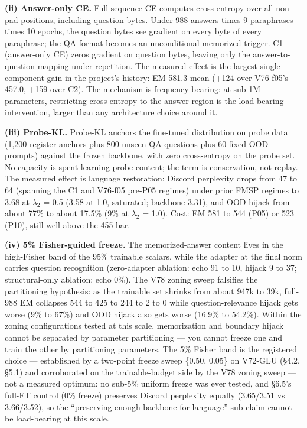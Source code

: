 \documentclass[11pt]{article}
\begin{document}
\textbf{(ii) Answer-only CE.} Full-sequence CE computes cross-entropy over all non-pad positions, including question bytes. Under 988 answers times 9 paraphrases times 10 epochs, the question bytes see gradient on every byte of every paraphrase; the QA format becomes an unconditional memorized trigger. C1 (answer-only CE) zeros gradient on question bytes, leaving only the answer-to-question mapping under repetition. The measured effect is the largest single-component gain in the project's history: EM 581.3 mean (+124 over V76-f05's 457.0, +159 over C2). The mechanism is frequency-bearing: at sub-1M parameters, restricting cross-entropy to the answer region is the load-bearing intervention, larger than any architecture choice around it.

\textbf{(iii) Probe-KL.} Probe-KL anchors the fine-tuned distribution on probe data (1{,}200 register anchors plus 800 unseen QA questions plus 60 fixed OOD prompts) against the frozen backbone, with zero cross-entropy on the probe set. No capacity is spent learning probe content; the term is conservation, not replay. The measured effect is language restoration: Discord perplexity drops from 47 to 64 (spanning the C1 and V76-f05 pre-P05 regimes) under prior FMSP regimes to 3.68 at $\lambda_2$ = 0.5 (3.58 at 1.0, saturated; backbone 3.31), and OOD hijack from about 77\% to about 17.5\% (9\% at $\lambda_2$ = 1.0). Cost: EM 581 to 544 (P05) or 523 (P10), still well above the 455 bar.

\textbf{(iv) 5\% Fisher-guided freeze.} The memorized-answer content lives in the high-Fisher band of the 95\% trainable scalars, while the adapter at the final norm carries question recognition (zero-adapter ablation: echo 91 to 10, hijack 9 to 37; structural-only ablation: echo 0\%). The V78 zoning sweep falsifies the partitioning hypothesis: as the trainable set shrinks from about 947k to 39k, full-988 EM collapses 544 to 425 to 244 to 2 to 0 while question-relevance hijack gets worse (9\% to 67\%) and OOD hijack also gets worse (16.9\% to 54.2\%). Within the zoning configurations tested at this scale, memorization and boundary hijack cannot be separated by parameter partitioning --- you cannot freeze one and train the other by partitioning parameters. The 5\% Fisher band is the registered choice --- established by a two-point freeze sweep \{0.50, 0.05\} on V72-GLU (\S4.2, \S5.1) and corroborated on the trainable-budget side by the V78 zoning sweep --- not a measured optimum: no sub-5\% uniform freeze was ever tested, and \S6.5's full-FT control (0\% freeze) preserves Discord perplexity equally (3.65/3.51 vs 3.66/3.52), so the ``preserving enough backbone for language'' sub-claim cannot be load-bearing at this scale.
\end{document}
